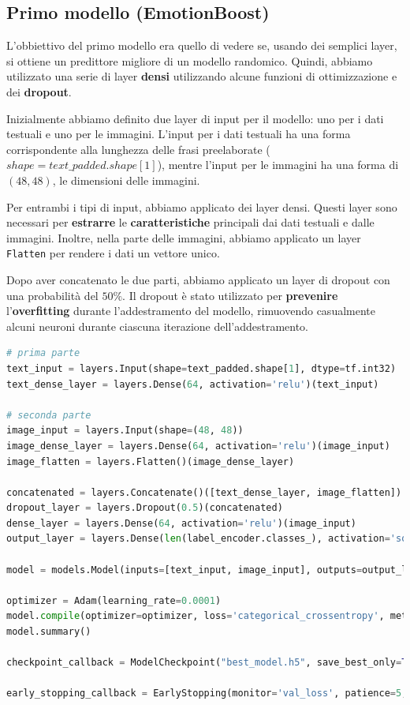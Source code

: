 \documentclass{article}
\begin{document}
\subsection{Primo modello (EmotionBoost)}
L'obbiettivo del primo modello era quello di vedere se, usando dei semplici layer, si ottiene un predittore migliore di un modello randomico. Quindi, abbiamo utilizzato una serie di layer \textbf{densi} utilizzando alcune funzioni di ottimizzazione e dei \textbf{dropout}.

\bigskip

Inizialmente abbiamo definito due layer di input per il modello: uno per i dati testuali e uno per le immagini. L'input per i dati testuali ha una forma corrispondente alla lunghezza delle frasi preelaborate ($shape=text\_padded.shape[1]$), mentre l'input per le immagini ha una forma di $(48, 48)$, le dimensioni delle immagini.

\bigskip

Per entrambi i tipi di input, abbiamo applicato dei layer densi. Questi layer sono necessari per \textbf{estrarre} le \textbf{caratteristiche} principali dai dati testuali e dalle immagini. Inoltre, nella parte delle immagini, abbiamo applicato un layer \verb|Flatten| per rendere i dati un vettore unico.

\bigskip

Dopo aver concatenato le due parti, abbiamo applicato un layer di dropout con una probabilità del $50\%$. Il dropout è stato utilizzato per \textbf{prevenire} l'\textbf{overfitting} durante l'addestramento del modello, rimuovendo casualmente alcuni neuroni durante ciascuna iterazione dell'addestramento.

\bigskip

\begin{lstlisting}[language=Python, caption=modello con soli layer densi]
# prima parte
text_input = layers.Input(shape=text_padded.shape[1], dtype=tf.int32)
text_dense_layer = layers.Dense(64, activation='relu')(text_input)

# seconda parte
image_input = layers.Input(shape=(48, 48))
image_dense_layer = layers.Dense(64, activation='relu')(image_input)
image_flatten = layers.Flatten()(image_dense_layer)

concatenated = layers.Concatenate()([text_dense_layer, image_flatten])
dropout_layer = layers.Dropout(0.5)(concatenated)
dense_layer = layers.Dense(64, activation='relu')(image_input)
output_layer = layers.Dense(len(label_encoder.classes_), activation='softmax')(dropout_layer)

model = models.Model(inputs=[text_input, image_input], outputs=output_layer)

optimizer = Adam(learning_rate=0.0001)
model.compile(optimizer=optimizer, loss='categorical_crossentropy', metrics=['accuracy'])
model.summary()

checkpoint_callback = ModelCheckpoint("best_model.h5", save_best_only=True, monitor="val_accuracy", mode="max")

early_stopping_callback = EarlyStopping(monitor='val_loss', patience=5, restore_best_weights=True)
\end{lstlisting}
\end{document}
